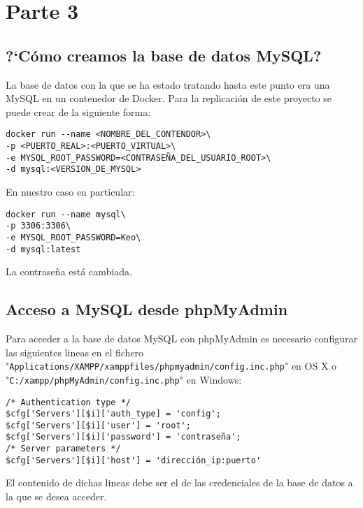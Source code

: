 \documentclass[a4paper, 11pt, oneside]{article} %
\begin{document}
\newpage


\section{Parte 3}

\subsection{?`Cómo creamos la base de datos MySQL?}

La base de datos con la que se ha estado tratando hasta este punto era una MySQL en un contenedor de Docker. Para la replicación de este proyecto se puede crear de la siguiente forma:

\begin{verbatim}
docker run --name <NOMBRE_DEL_CONTENDOR>\
-p <PUERTO_REAL>:<PUERTO_VIRTUAL>\
-e MYSQL_ROOT_PASSWORD=<CONTRASEÑA_DEL_USUARIO_ROOT>\
-d mysql:<VERSION_DE_MYSQL>
\end{verbatim}

En nuestro caso en particular:

\begin{verbatim}
docker run --name mysql\
-p 3306:3306\
-e MYSQL_ROOT_PASSWORD=Keo\
-d mysql:latest
\end{verbatim}

La contraseña está cambiada.




\subsection{Acceso a MySQL desde phpMyAdmin}

Para acceder a la base de datos MySQL con phpMyAdmin es necesario configurar las siguientes lineas en el fichero "\texttt{Applications/XAMPP/xamppfiles/phpmyadmin/config.inc.php}" en OS X o "\texttt{C:/xampp/phpMyAdmin/config.inc.php}" en Windows:

\begin{verbatim}
/* Authentication type */
$cfg['Servers'][$i]['auth_type] = 'config';
$cfg['Servers'][$i]['user'] = 'root';
$cfg['Servers'][$i]['password'] = 'contraseña';
/* Server parameters */
$cfg['Servers'][$i]['host'] = 'dirección_ip:puerto'
\end{verbatim}

El contenido de dichas lineas debe ser el de las credenciales de la base de datos a la que se desea acceder.
\end{document}
